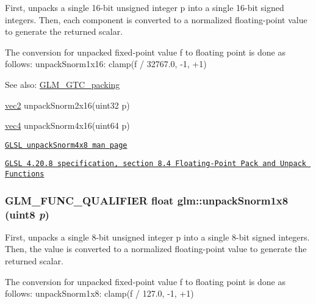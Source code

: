 First, unpacks a single 16-bit unsigned integer p into a single 16-bit signed integers. Then, each component is converted to a normalized floating-point value to generate the returned scalar.

The conversion for unpacked fixed-point value f to floating point is done as follows: unpackSnorm1x16: clamp(f / 32767.0, -1, +1)

\begin{Desc}
\item[See also:]\hyperlink{group__gtc__packing}{GLM\_\-GTC\_\-packing} 

\hyperlink{group__core__types_ga1618f51db67eaa145db101d8c8431d8}{vec2} unpackSnorm2x16(uint32 p) 

\hyperlink{group__core__types_g5881b1b022d7fd1b7218f5916532dd02}{vec4} unpackSnorm4x16(uint64 p) 

\href{http://www.opengl.org/sdk/docs/manglsl/xhtml/unpackSnorm1x16.xml}{\tt GLSL unpackSnorm4x8 man page} 

\href{http://www.opengl.org/registry/doc/GLSLangSpec.4.20.8.pdf}{\tt GLSL 4.20.8 specification, section 8.4 Floating-Point Pack and Unpack Functions} \end{Desc}
\hypertarget{group__gtc__packing_g6f2bebf536fbf7c8b97d4b306bb3354e}{
\subsubsection[unpackSnorm1x8]{\setlength{\rightskip}{0pt plus 5cm}GLM\_\-FUNC\_\-QUALIFIER float glm::unpackSnorm1x8 (uint8 {\em p})}}
\label{group__gtc__packing_g6f2bebf536fbf7c8b97d4b306bb3354e}


First, unpacks a single 8-bit unsigned integer p into a single 8-bit signed integers. Then, the value is converted to a normalized floating-point value to generate the returned scalar.

The conversion for unpacked fixed-point value f to floating point is done as follows: unpackSnorm1x8: clamp(f / 127.0, -1, +1)

